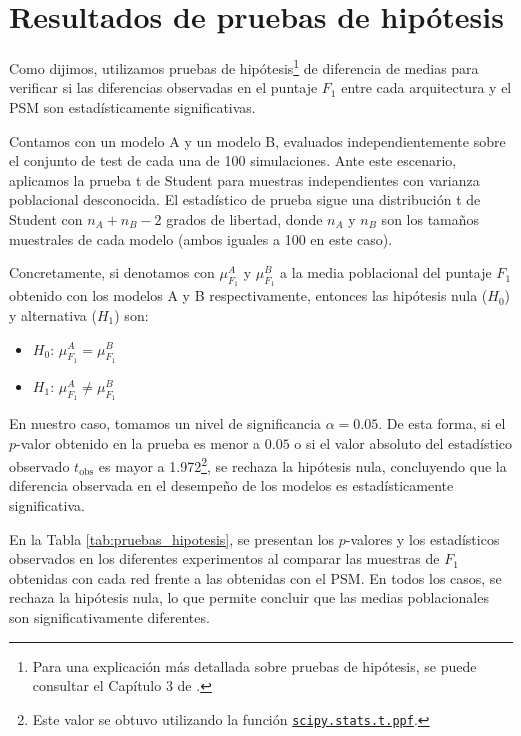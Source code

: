 \documentclass[../main.tex]{subfiles}
\begin{document}
\section*{Resultados de pruebas de hipótesis}
Como dijimos, utilizamos pruebas de hipótesis\footnote{Para una explicación más detallada
sobre pruebas de hipótesis, se puede consultar el Capítulo 3 de \cite{giuliodori-2022}.}
de diferencia de medias para verificar si las diferencias observadas en el puntaje \(F_1\)
entre cada arquitectura y el PSM son estadísticamente significativas.

Contamos con un modelo A y un modelo B, evaluados independientemente sobre el conjunto de
test de cada una de 100 simulaciones. Ante este escenario, aplicamos la prueba t de
Student para muestras independientes con varianza poblacional desconocida. El estadístico
de prueba sigue una distribución t de Student con \(n_A + n_B - 2\) grados de libertad,
donde \(n_A\) y \(n_B\) son los tamaños muestrales de cada modelo (ambos iguales a 100 en
este caso).

Concretamente, si denotamos con \(\mu^A_{F_1}\) y \(\mu^B_{F_1}\) a la media poblacional
del puntaje \(F_1\) obtenido con los modelos A y B respectivamente, entonces las hipótesis
nula (\(H_0\)) y alternativa (\(H_1\)) son:
\begin{itemize}[itemsep=0.05cm]
    \item \(H_0\): \(\mu^A_{F_1} = \mu^B_{F_1}\)
    \item \(H_1\): \(\mu^A_{F_1} \ne \mu^B_{F_1}\)
\end{itemize}

En nuestro caso, tomamos un nivel de significancia \(\alpha = 0.05\). De esta forma, si el
\(p\)-valor obtenido en la prueba es menor a \(0.05\) o si el valor absoluto del
estadístico observado \(t_{\text{obs}}\) es mayor a 1.972\footnote{Este valor se obtuvo
utilizando la función
\href{https://docs.scipy.org/doc/scipy/reference/generated/scipy.stats.t.html}{\texttt{scipy.stats.t.ppf}}.},
se rechaza la hipótesis nula, concluyendo que la diferencia observada en el desempeño de
los modelos es estadísticamente significativa.

En la Tabla \ref{tab:pruebas_hipotesis}, se presentan los \(p\)-valores y los estadísticos
observados en los diferentes experimentos al comparar las muestras de \(F_1\) obtenidas
con cada red frente a las obtenidas con el PSM. En todos los casos, se rechaza la
hipótesis nula, lo que permite concluir que las medias poblacionales son
significativamente diferentes.
\end{document}
